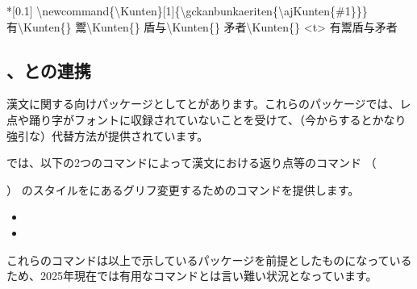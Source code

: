 \documentclass[uplatex, dvipdfmx, paper=a4paper, line_length=45zw, head_space=7zw, foot_space=10zw]{jlreq}
\begin{document}
\begin{demosource}*[0.1]
  {\textbackslash}newcommand\{{\textbackslash}Kunten\}[1]\{{\textbackslash}gckanbunkaeriten\{{\textbackslash}ajKunten\{\#1\}\}\}\\
  \vfil
  有{\textbackslash}Kunten\{\}%
  鬻{\textbackslash}Kunten\{\}%
  盾与{\textbackslash}Kunten\{\}%
  矛者{\textbackslash}Kunten\{\}%
  \tcblower
  \newcommand{\Kunten}[1]{\gckanbunkaeriten{\ajKunten{#1}}}
  \LARGE
  \pbox<t>{ 有\Kunten{下}鬻\Kunten{二}盾与\Kunten{一レ}矛者\Kunten{上} }
\end{demosource}

\subsection{\texorpdfstring{}{sfkanbun.sty}、\texorpdfstring{}{kunten2e.sty}との連携}

漢文に関する{\pLaTeX}向けパッケージとしてとがあります。これらのパッケージでは、レ点や踊り字がフォントに収録されていないことを受けて、（今からするとかなり強引な）代替方法が提供されています。

では、以下の2つのコマンドによって漢文における返り点等のコマンド
（\begin{itemize*}[label={}, afterlabel={}, itemjoin=、]
  \item {}
  \item {}
  \item {}
  \item {}
  \item {}
  \item {}
\end{itemize*}）
のスタイルを{\AdobeJapan}にあるグリフ変更するためのコマンドを提供します。

\begin{itemize}
  \item {}
  \item {}
\end{itemize}

これらのコマンドは以上で示しているパッケージを前提としたものになっているため、2025年現在では有用なコマンドとは言い難い状況となっています。
\end{document}
